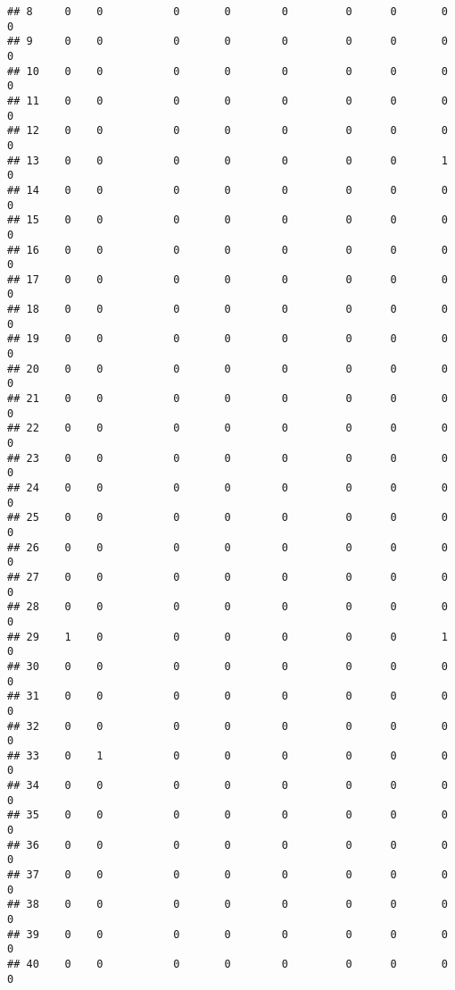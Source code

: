 \documentclass[
]{article}
\begin{document}
\begin{verbatim}
## 8     0    0           0       0        0         0      0       0         0
## 9     0    0           0       0        0         0      0       0         0
## 10    0    0           0       0        0         0      0       0         0
## 11    0    0           0       0        0         0      0       0         0
## 12    0    0           0       0        0         0      0       0         0
## 13    0    0           0       0        0         0      0       1         0
## 14    0    0           0       0        0         0      0       0         0
## 15    0    0           0       0        0         0      0       0         0
## 16    0    0           0       0        0         0      0       0         0
## 17    0    0           0       0        0         0      0       0         0
## 18    0    0           0       0        0         0      0       0         0
## 19    0    0           0       0        0         0      0       0         0
## 20    0    0           0       0        0         0      0       0         0
## 21    0    0           0       0        0         0      0       0         0
## 22    0    0           0       0        0         0      0       0         0
## 23    0    0           0       0        0         0      0       0         0
## 24    0    0           0       0        0         0      0       0         0
## 25    0    0           0       0        0         0      0       0         0
## 26    0    0           0       0        0         0      0       0         0
## 27    0    0           0       0        0         0      0       0         0
## 28    0    0           0       0        0         0      0       0         0
## 29    1    0           0       0        0         0      0       1         0
## 30    0    0           0       0        0         0      0       0         0
## 31    0    0           0       0        0         0      0       0         0
## 32    0    0           0       0        0         0      0       0         0
## 33    0    1           0       0        0         0      0       0         0
## 34    0    0           0       0        0         0      0       0         0
## 35    0    0           0       0        0         0      0       0         0
## 36    0    0           0       0        0         0      0       0         0
## 37    0    0           0       0        0         0      0       0         0
## 38    0    0           0       0        0         0      0       0         0
## 39    0    0           0       0        0         0      0       0         0
## 40    0    0           0       0        0         0      0       0         0

\end{verbatim}
\end{document}
